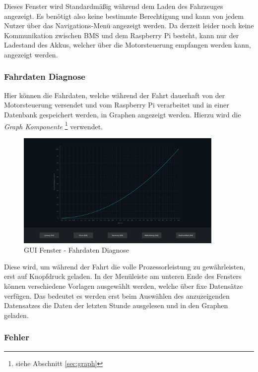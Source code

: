 Dieses Fenster wird Standardmäßig während dem Laden des Fahrzeuges angezeigt. Es benötigt also keine bestimmte Berechtigung und kann von jedem Nutzer über das Navigations-Menü angezeigt werden. Da derzeit leider noch keine Kommunikation zwischen BMS und dem Raspberry Pi besteht, kann nur der Ladestand des Akkus, welcher über die Motorsteuerung empfangen werden kann, angezeigt werden.

\subsubsection{Fahrdaten Diagnose} \label{sec:diagnosis}

Hier können die Fahrdaten, welche während der Fahrt dauerhaft von der Motorsteuerung versendet und vom Raspberry Pi verarbeitet und in einer Datenbank gespeichert werden, in Graphen angezeigt werden. Hierzu wird die \textit{Graph Komponente} \footnote{siehe Abschnitt \ref{sec:graph}} verwendet.
\begin{figure}[H]
	\begin{center}
		\includegraphics[width=10cm]{figures/hcis/window_diagnosis.png}
			\caption{GUI Fenster - Fahrdaten Diagnose}
			\label{fig:pageDiagnose}
	\end{center}
\end{figure}

 Diese wird, um während der Fahrt die volle Prozessorleistung zu gewährleisten, erst auf Knopfdruck geladen. In der Menüleiste am unteren Ende des Fensters können verschiedene Vorlagen ausgewählt werden, welche über fixe Datensätze verfügen. Das bedeutet es werden erst beim Auswählen des anzuzeigenden Datensatzes die Daten der letzten Stunde ausgelesen und in den Graphen geladen.


\newpage

\subsubsection{Fehler}

